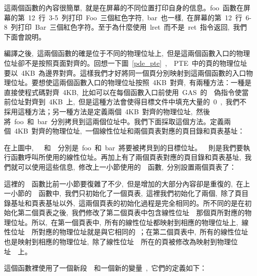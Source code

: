 這兩個函數的內容很簡單,~就是在屏幕的不同位置打印自身的信息。foo~函數在屏幕的第~12~行~3-5~列打印~Foo~三個紅色字符,~bar~也一樣,~在屏幕的第~12~行~6-8~列打印~Bar~三個紅色字符。至于為什麼使用~lret~而不是~ret~指令返回,~我們下面會說明。

編譯之後,~這兩個函數的確是位于不同的物理位址上,~但是這兩個函數入口的物理位址卻不是按照頁面對齊的。回想一下圖~\ref{pde_pte}~,~~PTE~中的頁的物理位址要以~4KB~為邊界對齊。這樣我們才好將同一個頁分別映射到這兩個函數的入口物理位址。要想使這兩個函數入口的物理位址按照~4KB~對齊,~有兩種方法：一種是直接使程式碼對齊~4KB,~比如可以在每個函數入口前使用~GAS~的~~偽指令使當前位址對齊到~4KB~上,~但是這種方法會使得目標文件中填充大量的~0~,~我們不採用這種方法；另一種方法是定義兩個~4KB~對齊的物理位址,~然後將~foo~和~bar~分別拷貝到這兩個位址中。我們下面採取這個方法。定義兩個~4KB~對齊的物理位址,~一個線性位址和兩個頁表對應的頁目錄和頁表基址：


在上圖中,~~~和~~分別是~foo~和~bar~將要被拷貝到的目標位址。~~則是我們要執行函數呼叫所使用的線性位址。再加上有了兩個頁表對應的頁目錄和頁表基址,~我們就可以使用這些信息,~修改上一小節使用的~~函數,~分別設置兩個頁表了：


這裡的~~函數比前一小節要復雜了不少,~但是增加的大部分內容卻是重復的,~在上一小節的~~函數中,~我們只初始化了一個頁表,~這裡我們初始化了兩個,~除了頁目錄基址和頁表基址以外,~這兩個頁表的初始化過程是完全相同的。所不同的是在初始化第二個頁表之後,~我們修改了第二個頁表中包含線性位址~~那個頁所對應的物理位址。所以,~在第一個頁表中,~所有的線性位址都映射到相應的物理位址上,~線性位址~~所對應的物理位址就是與它相同的~；在第二個頁表中,~所有的線性位址也是映射到相應的物理位址,~除了線性位址~~所在的頁被修改為映射到物理位址~~上。

這個函數裡使用了一個新段~~和一個新的變量~,~它們的定義如下：

